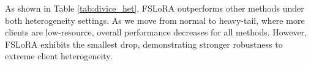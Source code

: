 \documentclass{article} %
\theoremstyle{plain}
\theoremstyle{definition}
\begin{document}

As shown in Table \ref{tab:divice_het}, FSLoRA outperforms other methods under both heterogeneity settings. As we move from normal to heavy-tail, where more clients are low-resource, overall performance decreases for all methods. However, FSLoRA exhibits the smallest drop, demonstrating stronger robustness to extreme client heterogeneity.

\end{document}
